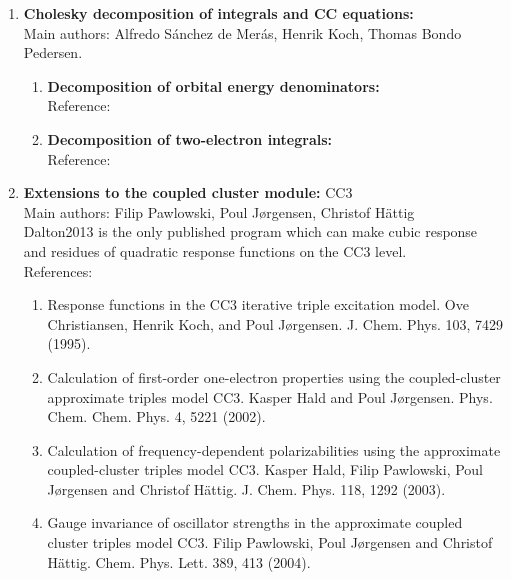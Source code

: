 \begin{enumerate}

\item{\bf Cholesky decomposition of integrals and CC equations:} \\
Main authors: Alfredo S{\'a}nchez {de Mer{\'a}s}, Henrik Koch,
Thomas Bondo Pedersen.
\begin{enumerate}
  \item{\bf Decomposition of orbital energy denominators:}  \\
   Reference: 
   \cite{jcp_chopt}
  \item{\bf Decomposition of two-electron integrals:}  \\
   Reference: 
   \cite{choint}
\end{enumerate}

\item{\bf Extensions to the coupled cluster module:} CC3 \\
Main authors: Filip Pawlowski, Poul J\o rgensen, Christof H\"{a}ttig \\
Dalton2013 is the only published program which can make cubic response
and residues of quadratic response functions on the CC3 level. \\
   References:
\begin{enumerate}
\item	Response functions in the CC3 iterative triple excitation model.
Ove Christiansen, Henrik Koch, and Poul J\o rgensen.
J. Chem. Phys. 103, 7429 (1995).

\item	Calculation of first-order one-electron properties using the
coupled-cluster approximate triples model CC3.
Kasper Hald and Poul J\o rgensen.
Phys. Chem. Chem. Phys. 4, 5221 (2002).

\item	Calculation of frequency-dependent polarizabilities using the
approximate coupled-cluster triples model CC3.
Kasper Hald, Filip Pawlowski, Poul J\o rgensen and Christof H\"{a}ttig.
J. Chem. Phys. 118, 1292 (2003).

\item	Gauge invariance of oscillator strengths in the approximate
coupled
cluster triples model CC3.
Filip Pawlowski, Poul J\o rgensen and Christof H\"{a}ttig.
Chem. Phys. Lett. 389, 413 (2004).


\end{enumerate}
\end{enumerate}
